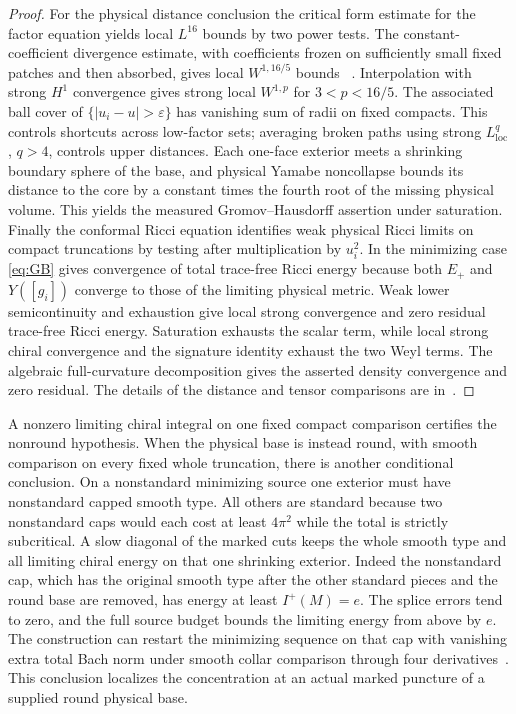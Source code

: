 \documentclass[11pt]{article}
\numberwithin{equation}{section}
\theoremstyle{definition}
\theoremstyle{remark}
\begin{document}
\begin{proof}
For the physical distance conclusion the critical form estimate for
the factor equation yields local \(L^{16}\) bounds by two power
tests. The constant-coefficient divergence estimate, with coefficients
frozen on sufficiently small fixed patches and then absorbed, gives
local \(W^{1,16/5}\) bounds
~\cite[Chapter I, Theorem 1]{CalderonZygmund1952Singular}.
Interpolation with strong \(H^1\) convergence gives strong local
\(W^{1,p}\) for \(3<p<16/5\). The associated ball cover of
\(\{|u_i-u|>\varepsilon\}\) has vanishing sum of radii on fixed compacts.
This controls shortcuts across low-factor sets; averaging broken
paths using strong \(L^q_{\mathrm{loc}}\), \(q>4\), controls
upper distances. Each one-face exterior meets a shrinking boundary
sphere of the base, and physical Yamabe noncollapse bounds its
distance to the core by a constant times the fourth root of the
missing physical volume. This yields the measured
Gromov--Hausdorff assertion under saturation. Finally the conformal
Ricci equation identifies weak physical Ricci limits on compact
truncations by testing after multiplication by \(u_i^2\).
In the minimizing case \eqref{eq:GB} gives convergence of total
trace-free Ricci energy because both \(E_+\) and \(Y([g_i])\)
converge to those of the limiting physical metric. Weak lower
semicontinuity and exhaustion give local strong convergence and
zero residual trace-free Ricci energy. Saturation exhausts the
scalar term, while local strong chiral convergence and the signature
identity exhaust the two Weyl terms. The algebraic full-curvature
decomposition gives the asserted density convergence and zero
residual. The details of the distance and tensor comparisons are
in~\cite{Baker2026MarkedLimits}.
\end{proof}

A nonzero limiting chiral integral on one fixed compact comparison
certifies the nonround hypothesis. When the physical base is instead
round, with smooth comparison on every fixed whole truncation, there
is another conditional conclusion. On a nonstandard minimizing source
one exterior must have nonstandard capped smooth type. All others
are standard because two nonstandard caps would each cost at least
\(4\pi^2\) while the total is strictly subcritical. A slow diagonal
of the marked cuts keeps the whole smooth type and all limiting
chiral energy on that one shrinking exterior. Indeed the nonstandard
cap, which has the original smooth type after the other standard
pieces and the round base are removed, has energy at least
\(I^+(M)=e\). The splice errors tend to zero, and the full source
budget bounds the limiting energy from above by \(e\).
The construction can restart the minimizing sequence on that cap
with vanishing extra total Bach norm under smooth collar
comparison through four derivatives~\cite{Baker2026MarkedNecks}.
This conclusion localizes the concentration at an actual marked
puncture of a supplied round physical base.
\end{document}
